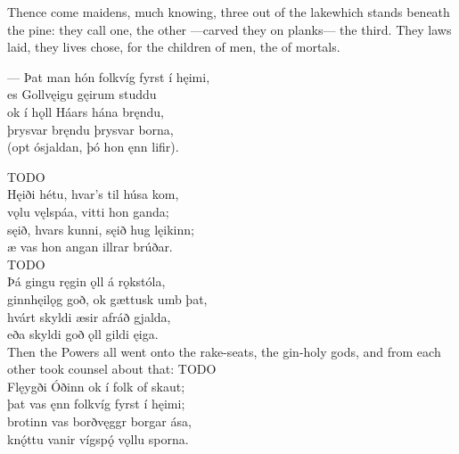 \bvb Thence come maidens, much knowing, three out of the lake\footnotemark[1] which stands beneath the pine\footnotemark[2]:  they call one, the other —carved they on planks— the third. They laws laid, they lives chose, for the children of men, the  of mortals.\\%

\bva — Þat man hón folkvíg \hld fyrst í hęimi, \\%
es Gollvęigu \hld gęirum studdu \\%
ok í hǫll Háars \hld hána bręndu, \\%
þrysvar bręndu \hld þrysvar borna, \\%
(opt ósjaldan, \hld þó hon ęnn lifir).\footnotemark[1]\\%

\bvb TODO\\%

\bva Hęiði hétu, \hld hvar’s til húsa kom, \\%
vǫlu vęlspáa, \hld vitti hon ganda; \\%
sęið, hvars kunni, \hld sęið hug lęikinn; \\%
æ vas hon angan \hld illrar brúðar.\\%

\bvb TODO\\%

\bva Þá gingu ręgin ǫll \hld á rǫkstóla, \\%
ginnhęilǫg goð, \hld ok gættusk umb þat, \\%
hvárt skyldi æsir \hld afráð gjalda, \\%
eða skyldi goð ǫll \hld gildi ęiga.\\%

\bvb Then the Powers all went onto the rake-seats, the gin-holy gods, and from each other took counsel about that: TODO\\%

\bva Flęygði Óðinn \hld ok í folk of skaut; \\%
þat vas ęnn folkvíg \hld fyrst í hęimi; \\%
brotinn vas borðvęggr \hld borgar ása, \\%
knǫ́ttu vanir vígspǫ́ \hld vǫllu sporna.\\%

